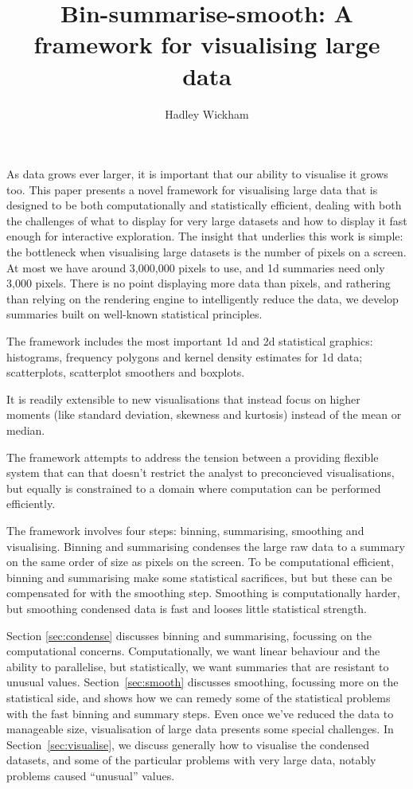 \documentclass[journal]{vgtc}                %
\title{Bin-summarise-smooth: A framework for visualising large data}
\author{Hadley Wickham}
\begin{document}

\maketitle

As data grows ever larger, it is important that our ability to visualise it grows too. This paper presents a novel framework for visualising large data that is designed to be both computationally and statistically efficient, dealing with both the challenges of what to display for very large datasets and how to display it fast enough for interactive exploration. The insight that underlies this work is simple: the bottleneck when visualising large datasets is the number of pixels on a screen. At most we have around 3,000,000 pixels to use, and 1d summaries need only 3,000 pixels. There is no point displaying more data than pixels, and rathering than relying on the rendering engine to intelligently reduce the data, we develop summaries built on well-known statistical principles. 

The framework includes the most important 1d and 2d statistical graphics: histograms, frequency polygons and kernel density estimates for 1d data; scatterplots, scatterplot smoothers and boxplots. 

It is readily extensible to new visualisations that instead focus on higher moments (like standard deviation, skewness and kurtosis) instead of the mean or median.

The framework attempts to address the tension between a providing flexible system that can that doesn't restrict the analyst to preconcieved visualisations, but equally is constrained to a domain where computation can be performed efficiently. 

The framework involves four steps: binning, summarising, smoothing and visualising. Binning and summarising condenses the large raw data to a summary on the same order of size as pixels on the screen. To be computational efficient, binning and summarising make some statistical sacrifices, but but these can be compensated for with the smoothing step. Smoothing is computationally harder, but smoothing condensed data is fast and looses little statistical strength. 

Section \ref{sec:condense} discusses binning and summarising, focussing on the computational concerns. Computationally, we want linear behaviour and the ability to parallelise, but statistically, we want summaries that are resistant to unusual values. Section~\ref{sec:smooth} discusses smoothing, focussing more on the statistical side, and shows how we can remedy some of the statistical problems with the fast binning and summary steps. Even once we've reduced the data to manageable size, visualisation of large data presents some special challenges. In Section~\ref{sec:visualise}, we discuss generally how to visualise the condensed datasets, and some of the particular problems with very large data, notably problems caused ``unusual'' values.  
\end{document}
